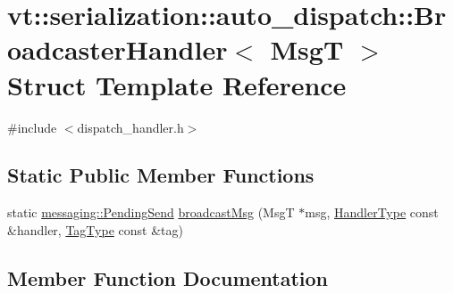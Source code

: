 \hypertarget{structvt_1_1serialization_1_1auto__dispatch_1_1_broadcaster_handler}{}\section{vt\+:\+:serialization\+:\+:auto\+\_\+dispatch\+:\+:Broadcaster\+Handler$<$ MsgT $>$ Struct Template Reference}
\label{structvt_1_1serialization_1_1auto__dispatch_1_1_broadcaster_handler}


{\ttfamily \#include $<$dispatch\+\_\+handler.\+h$>$}

\subsection*{Static Public Member Functions}
\begin{DoxyCompactItemize}
\item 
static \hyperlink{structvt_1_1messaging_1_1_pending_send}{messaging\+::\+Pending\+Send} \hyperlink{structvt_1_1serialization_1_1auto__dispatch_1_1_broadcaster_handler_a3a9f9b3bfb694ec73f7bbf69f778e127}{broadcast\+Msg} (MsgT $\ast$msg, \hyperlink{namespacevt_af64846b57dfcaf104da3ef6967917573}{Handler\+Type} const \&handler, \hyperlink{namespacevt_a84ab281dae04a52a4b243d6bf62d0e52}{Tag\+Type} const \&tag)
\end{DoxyCompactItemize}


\subsection{Member Function Documentation}
\mbox{\label{structvt_1_1serialization_1_1auto__dispatch_1_1_broadcaster_handler_a3a9f9b3bfb694ec73f7bbf69f778e127}} 
